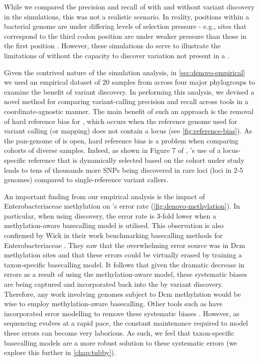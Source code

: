 While we compared the precision and recall of \pandora{} with and without variant discovery in the simulations, this was not a realistic scenario. In reality, positions within a bacterial genome are under differing levels of selection pressure - e.g., sites that correspond to the third codon position are under weaker pressure than those in the first position \cite{Lobry2002}. However, these simulations do serve to illustrate the limitations of \pandora{} without the capacity to discover variation not present in a \panrg{}.  

\noindent
Given the contrived nature of the simulation analysis,  in \autoref{sec:denovo-empirical} we used an empirical dataset of 20 \ecoli{} samples from across four major phylogroups to examine the benefit of \denovo{} variant discovery. In performing this analysis, we devised a novel method for comparing variant-calling precision and recall across tools in a coordinate-agnostic manner. The main benefit of such an approach is the removal of hard reference bias for \pandora{}, which occurs when the reference genome used for variant calling (or mapping) does not contain a locus (see \autoref{fig:reference-bias}). As the pan-genome of \ecoli{} is open, hard reference bias is a problem when comparing cohorts of diverse samples. Indeed, as shown in Figure 7 of \cite{pandora}, \pandora{}'s use of a locus-specific reference that is dynamically selected based on the cohort under study leads to tens of thousands more SNPs being discovered in rare loci (loci in 2-5 genomes) compared to single-reference variant callers.

An important finding from our empirical analysis is the impact of Enterobacteriaceae methylation on \pandora{}'s \ont{} error rate (\autoref{fig:denovo-methylation}). In particular, when using \denovo{} discovery, the \ont{} error rate is 3-fold lower when a methylation-aware basecalling model is utilised. This observation is also confirmed by Wick \etal{} in their work benchmarking \ont{} basecalling methods for Enterobacteriaceae \cite{wick2019}. They saw that the overwhelming error source was in Dcm methylation sites and that these errors could be virtually erased by training a taxon-specific basecalling model. It follows that given the dramatic decrease in \denovo{} errors as a result of using the methylation-aware model, these systematic biases are being captured and incorporated back into the \panrg{} by variant discovery. Therefore, any \ont{} work involving genomes subject to Dcm methylation would be wise to employ methylation-aware basecalling. Other tools such as  have incorporated error modelling to remove these systematic biases \cite{Loman2015}. However, as \ont{} sequencing evolves at a rapid pace, the constant maintenance required to model these errors can become very laborious. As such, we feel that taxon-specific basecalling models are a more robust solution to these systematic errors (we explore this further in \autoref{chap:tubby}).

